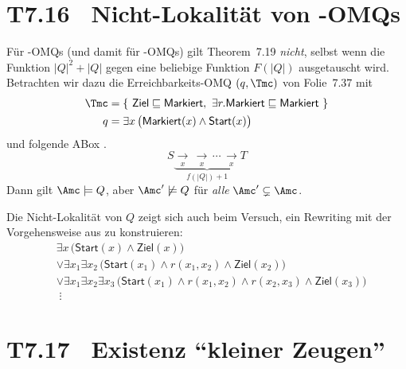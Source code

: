\documentclass[fontsize=11pt, twoside=false, numbers=autoenddot]{scrbook}
\begin{document}
\enlargethispage{12mm}
\section*{T7.16~ {\boldmath Nicht-Lokalität von \EL-OMQs}}

Für \EL-OMQs (und damit für \ALC-OMQs) gilt Theorem~7.19 \emph{nicht},
selbst wenn die Funktion $|Q|^2+|Q|$ gegen eine beliebige Funktion
$F(|Q|)$ ausgetauscht wird. Betrachten wir dazu die Erreichbarkeits-OMQ
$(q,\Tmc)$ von Folie~7.37 mit
%
\begin{align*}
  \Tmc & = \{~  \textsf{Ziel} \sqsubseteq \textsf{Markiert},~ \exists r.\textsf{Markiert} \sqsubseteq \textsf{Markiert} ~\} \\
  q    & = \exists x \, \big(\textsf{Markiert}(x) \wedge \textsf{Start}(x)\big)
\end{align*}
%
und folgende ABox \Amc.
\vspace*{-\baselineskip}
\[
  S \mathrel{\underbrace{\underset{x}{\longrightarrow}\, \underset{x}{\longrightarrow} \,\cdots\, \underset{x}{\longrightarrow}}_{f(|Q|)+1}} T
\]
Dann gilt $\Amc \models Q$, aber $\Amc' \not\models Q$
für \emph{alle} $\Amc' \subsetneq \Amc$.

\parII
Die Nicht-Lokalität von $Q$ zeigt sich auch beim Versuch,
ein Rewriting mit der Vorgehensweise aus
\textsf{\hyperlink{BspRewriting}{\BspRewriting}} zu konstruieren:
%
\begin{align*}
  & \exists x\,\big(\textsf{Start}(x) \land \textsf{Ziel}(x)\big) \\
  & \lor \exists x_1\exists x_2\,\big(\textsf{Start}(x_1) \land r(x_1,x_2) \land \textsf{Ziel}(x_2)\big) \\
  & \lor \exists x_1\exists x_2\exists x_3\,\big(\textsf{Start}(x_1) \land r(x_1,x_2) \land r(x_2,x_3) \land \textsf{Ziel}(x_3)\big) \\[-4pt]
  & \;\vdots
\end{align*}

\section*{T7.17~ {\boldmath Existenz "`kleiner Zeugen"'}}
\end{document}

